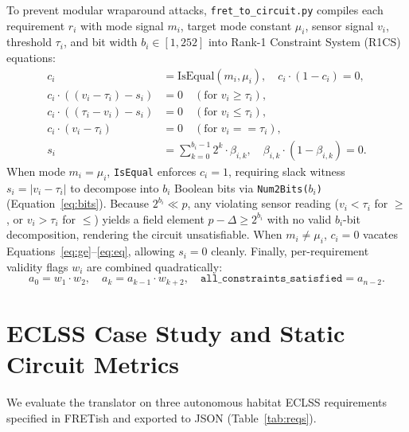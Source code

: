 \documentclass[runningheads]{llncs}
\begin{document}
To prevent modular wraparound attacks, \texttt{fret\_to\_circuit.py} compiles each requirement $r_i$ with mode signal $m_i$, target mode constant $\mu_i$, sensor signal $v_i$, threshold $\tau_i$, and bit width $b_i \in [1, 252]$ into Rank-1 Constraint System (R1CS) equations:
\begin{align}
    c_i &= \text{IsEqual}(m_i, \mu_i), \quad c_i \cdot (1 - c_i) = 0, \label{eq:guard}\\
    c_i \cdot ((v_i - \tau_i) - s_i) &= 0 \quad (\text{for } v_i \ge \tau_i), \label{eq:ge}\\
    c_i \cdot ((\tau_i - v_i) - s_i) &= 0 \quad (\text{for } v_i \le \tau_i), \label{eq:le}\\
    c_i \cdot (v_i - \tau_i) &= 0 \quad (\text{for } v_i == \tau_i), \label{eq:eq}\\
    s_i &= \sum_{k=0}^{b_i - 1} 2^k \cdot \beta_{i,k}, \quad \beta_{i,k} \cdot (1 - \beta_{i,k}) = 0. \label{eq:bits}
\end{align}
When mode $m_i = \mu_i$, \texttt{IsEqual} enforces $c_i = 1$, requiring slack witness $s_i = |v_i - \tau_i|$ to decompose into $b_i$ Boolean bits via \texttt{Num2Bits($b_i$)} (Equation~\ref{eq:bits}). Because $2^{b_i} \ll p$, any violating sensor reading ($v_i < \tau_i$ for $\ge$, or $v_i > \tau_i$ for $\le$) yields a field element $p - \Delta \ge 2^{b_i}$ with no valid $b_i$-bit decomposition, rendering the circuit unsatisfiable. When $m_i \ne \mu_i$, $c_i = 0$ vacates Equations~\ref{eq:ge}--\ref{eq:eq}, allowing $s_i = 0$ cleanly. Finally, per-requirement validity flags $w_i$ are combined quadratically:
\begin{equation}
    a_0 = w_1 \cdot w_2, \quad a_{k} = a_{k-1} \cdot w_{k+2}, \quad \texttt{all\_constraints\_satisfied} = a_{n-2}.
\end{equation}

\section{ECLSS Case Study and Static Circuit Metrics}
We evaluate the translator on three autonomous habitat ECLSS requirements specified in FRETish and exported to JSON (Table~\ref{tab:reqs}).
\end{document}
